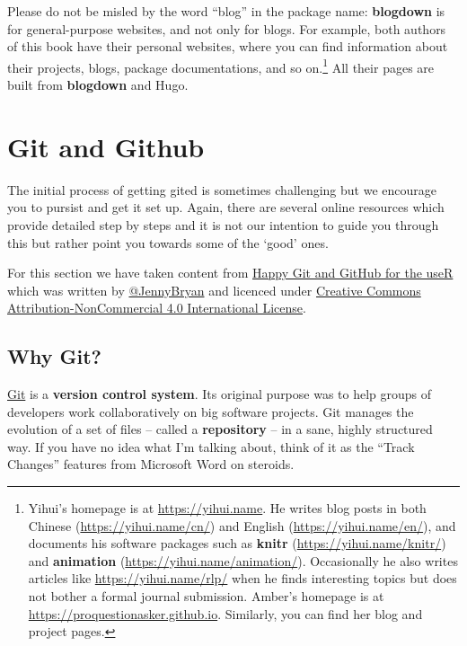 \documentclass[]{book}
\let\rmarkdownfootnote\footnote%
\def\footnote{\protect\rmarkdownfootnote}
\theoremstyle{definition}
\theoremstyle{definition}
\theoremstyle{remark}
\begin{document}
Please do not be misled by the word ``blog'' in the package name:
\textbf{blogdown} is for general-purpose websites, and not only for
blogs. For example, both authors of this book have their personal
websites, where you can find information about their projects, blogs,
package documentations, and so on.\footnote{Yihui's homepage is at
  \url{https://yihui.name}. He writes blog posts in both Chinese
  (\url{https://yihui.name/cn/}) and English
  (\url{https://yihui.name/en/}), and documents his software packages
  such as \textbf{knitr} (\url{https://yihui.name/knitr/}) and
  \textbf{animation} (\url{https://yihui.name/animation/}). Occasionally
  he also writes articles like \url{https://yihui.name/rlp/} when he
  finds interesting topics but does not bother a formal journal
  submission. Amber's homepage is at
  \url{https://proquestionasker.github.io}. Similarly, you can find her
  blog and project pages.} All their pages are built from
\textbf{blogdown} and Hugo.

\section{Git and Github}\label{git-and-github}

The initial process of getting gited is sometimes challenging but we
encourage you to pursist and get it set up. Again, there are several
online resources which provide detailed step by steps and it is not our
intention to guide you through this but rather point you towards some of
the `good' ones.

For this section we have taken content from
\href{http://happygitwithr.com/}{Happy Git and GitHub for the useR}
which was written by \href{https://twitter.com/JennyBryan}{@JennyBryan}
and licenced under
\href{http://creativecommons.org/licenses/by-nc/4.0/}{Creative Commons
Attribution-NonCommercial 4.0 International License}.

\subsection{Why Git?}\label{why-git}

\href{http://git-scm.com}{Git} is a \textbf{version control system}. Its
original purpose was to help groups of developers work collaboratively
on big software projects. Git manages the evolution of a set of files --
called a \textbf{repository} -- in a sane, highly structured way. If you
have no idea what I'm talking about, think of it as the ``Track
Changes'' features from Microsoft Word on steroids.
\end{document}
